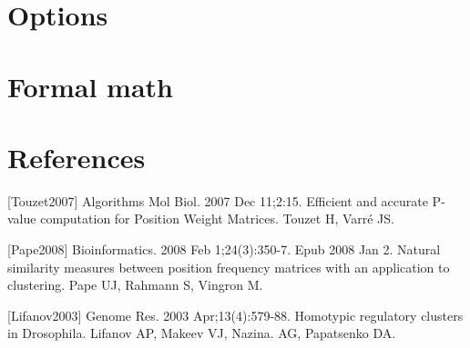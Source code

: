 \documentclass[draft]{article}
\newcommand*{\pvalue}{\mbox{P-value}}
\begin{document}
\section{Options}








\section{Formal math}
  
  

\section*{References}
[Touzet2007] Algorithms Mol Biol. 2007 Dec 11;2:15. Efficient and accurate \pvalue  
computation for Position Weight Matrices. Touzet H, Varré JS.

[Pape2008] Bioinformatics. 2008 Feb 1;24(3):350-7. Epub 2008 Jan 2. Natural similarity 
measures between position frequency matrices with an application to clustering. Pape UJ, 
Rahmann S, Vingron M.

[Lifanov2003] Genome Res. 2003 Apr;13(4):579-88. Homotypic regulatory clusters in 
Drosophila. Lifanov AP, Makeev VJ, Nazina. AG, Papatsenko DA.
\end{document}
